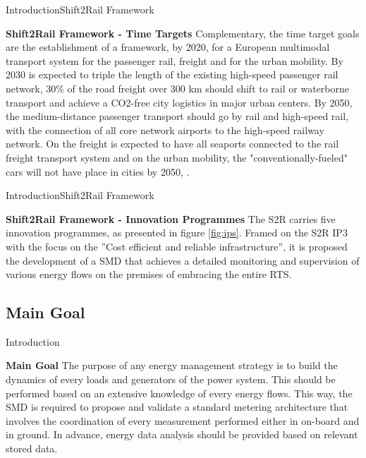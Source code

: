 \begin{frame}{Introduction}{Shift2Rail Framework}
\begin{block}{\textbf{Shift2Rail Framework - Time Targets}}
	Complementary, the time target goals are the establishment of a framework, by 2020, for a European multimodal transport system for the passenger rail, freight and for the urban mobility. By 2030 is expected to triple the length of the existing high-speed passenger rail network, 30\% of the road freight over 300 km should shift to rail or waterborne transport and achieve a CO2-free city logistics in major urban centers. By 2050, the medium-distance passenger transport should go by rail and high-speed rail, with the connection of all core network airports to the high-speed railway network. On the freight is expected to have all seaports connected to the rail freight transport system and on the urban mobility, the "conventionally-fueled" cars will not have place in cities by 2050, \cite{shift2rail2015}.
	
\end{block}
\end{frame}

\begin{frame}{Introduction}{Shift2Rail Framework}
\begin{block}{\textbf{Shift2Rail Framework - Innovation Programmes}}
The \ac{S2R} carries five innovation programmes, as presented in figure \ref{fig:ips}. Framed on the S2R \ac{IP3} with the focus on the ”Cost efficient and reliable infrastructure”, it is proposed the development of a \ac{SMD} that achieves a detailed monitoring and supervision of various energy flows on the premises of embracing the entire \ac{RTS}.
\end{block}
\end{frame}

\subsection{Main Goal}

\begin{frame}{Introduction}{}
\begin{block}{\textbf{Main Goal}}
The purpose of any energy management strategy is to build the dynamics of every loads and generators of the power system. 
This should be performed based on an extensive knowledge of every energy flows. 
This way, the \ac{SMD} is required to propose and validate a standard metering architecture that involves the coordination of every measurement performed either in on-board and in ground. 
In advance, energy data analysis should be provided based on relevant stored data. 
\end{block}
\end{frame}
